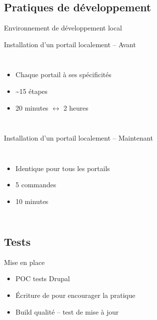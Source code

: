 \subsection[Développement]{Pratiques de développement}

\begin{frame}{Environnement de développement local}
	\begin{overprint}
		\begin{block}{Installation d'un portail localement -- Avant}
			\begin{columns}[onlytextwidth]
				\begin{itemize}
					\item Chaque portail à ses spécificités
					\item \textasciitilde 15 étapes
					\item 20 minutes $\longleftrightarrow$ 2 heures
				\end{itemize}
			\end{columns}
		\end{block}
		\begin{block}{Installation d'un portail localement -- Maintenant}
			\begin{columns}[onlytextwidth]
				\begin{itemize}
					\item Identique pour tous les portails
					\item 5 commandes
					\item 10 minutes
				\end{itemize}
			\end{columns}
		\end{block}
	\end{overprint}
\end{frame}

\subsection{Tests}
\begin{frame}{\subsecname}
	\begin{block}{Mise en place}
		\begin{itemize}
			\item POC tests Drupal
			\item Écriture de  pour encourager la pratique
			\item Build qualité -- test de mise à jour
		\end{itemize}
	\end{block}
\end{frame}

